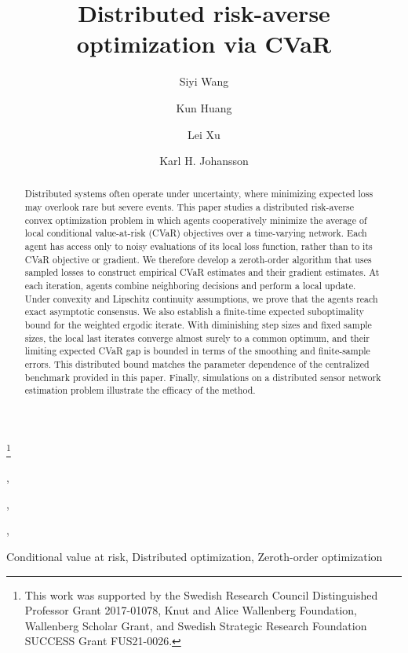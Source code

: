 \documentclass[twocolumn]{autart}    %
\newcommand{\1}{\mathbf{1}}
\begin{document}
\begin{frontmatter}
%

\title{Distributed risk-averse optimization via CVaR} %
 

\thanks[footnoteinfo]{This work was supported by the Swedish Research Council Distinguished Professor Grant 2017-01078, Knut and Alice Wallenberg Foundation, Wallenberg Scholar Grant, and Swedish Strategic Research Foundation SUCCESS Grant FUS21-0026.}

\author[DCS]{Siyi Wang},    %
\author[DCS]{Kun Huang},               %
\author[DCS]{Lei Xu},  %
\author[DCS]{Karl H. Johansson} 


\address[DCS]{Department of Decision and Control Systems, School of Electrical Engineering and Computer Science, KTH Royal Institute of Technology,
10044  Stockholm, Sweden}    
 
 
          
\begin{keyword}                           %
Conditional value at risk, 
Distributed optimization,
Zeroth-order optimization 
\end{keyword}                             %


\begin{abstract}
Distributed systems often operate under uncertainty, where minimizing expected loss may overlook rare but severe events.
This paper studies a distributed risk-averse convex optimization problem in which agents cooperatively minimize the average of local conditional value-at-risk (CVaR) objectives over a time-varying network. 
Each agent has access only to noisy evaluations of its local loss function, 
rather than to its CVaR objective or gradient.
We therefore develop a zeroth-order algorithm that uses 
sampled losses to construct empirical CVaR estimates and their gradient estimates.
At each iteration, agents combine neighboring decisions and perform a local update. 
Under convexity and Lipschitz continuity assumptions, 
we prove that the agents reach exact asymptotic consensus. 
We also establish a finite-time expected suboptimality bound for the weighted ergodic iterate.  
With diminishing step sizes and fixed sample sizes, the local last iterates converge almost surely to a common optimum, and their limiting expected CVaR gap is bounded in terms of the smoothing and finite-sample errors.  
This distributed bound matches the parameter dependence of the centralized benchmark provided in this paper. 
Finally, simulations on a distributed sensor network estimation problem illustrate the efficacy of the method.
\end{abstract}

\end{frontmatter}
 
\end{document}
